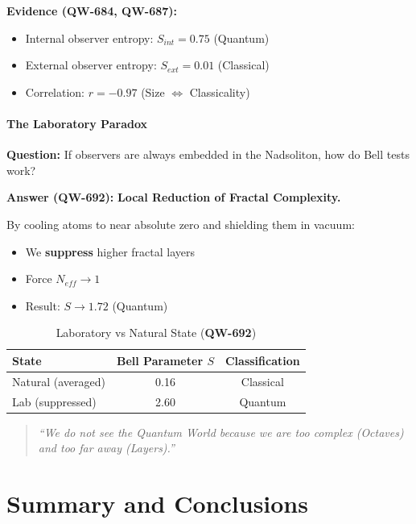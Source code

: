 \documentclass[11pt,a4paper]{book}
\theoremstyle{remark}
\newcommand{\QW}[1]{\textbf{QW-#1}}
\begin{document}
\textbf{Evidence (\QW{684}, \QW{687}):}
\begin{itemize}
    \item Internal observer entropy: $S_{int} = 0.75$ (Quantum)
    \item External observer entropy: $S_{ext} = 0.01$ (Classical)
    \item Correlation: $r = -0.97$ (Size $\Leftrightarrow$ Classicality)
\end{itemize}

\subsection{The Laboratory Paradox}

\textbf{Question:} If observers are always embedded in the Nadsoliton, how do Bell tests work?

\textbf{Answer (\QW{692}):} \textbf{Local Reduction of Fractal Complexity.}

By cooling atoms to near absolute zero and shielding them in vacuum:
\begin{itemize}
    \item We \textbf{suppress} higher fractal layers
    \item Force $N_{eff} \rightarrow 1$
    \item Result: $S \rightarrow 1.72$ (Quantum)
\end{itemize}

\begin{table}[H]
\centering
\caption{Laboratory vs Natural State (\QW{692})}
\begin{tabular}{|l|c|c|}
\hline
\textbf{State} & \textbf{Bell Parameter $S$} & \textbf{Classification} \\
\hline
Natural (averaged) & 0.16 & Classical \\
Lab (suppressed) & 2.60 & Quantum \\
\hline
\end{tabular}
\end{table}

\begin{quote}
\textit{``We do not see the Quantum World because we are too complex (Octaves) and too far away (Layers).''}
\end{quote}

\newpage
\part{Summary and Conclusions}
\end{document}
